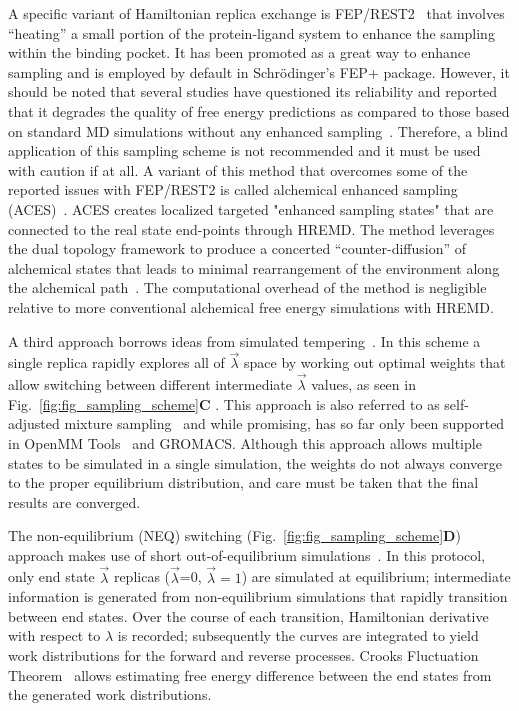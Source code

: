 \documentclass[9pt,bestpractices]{livecoms}
\begin{document}
A specific variant of Hamiltonian replica exchange is FEP/REST2~\cite{rest2, feprest} that involves ``heating'' a small portion of the protein-ligand system to enhance the sampling within the binding pocket. It has been promoted as a great way to enhance sampling and is employed by default in Schr\"{o}dinger's FEP+ package. However, it should be noted that several studies have questioned its reliability and reported that it degrades the quality of free energy predictions as compared to those based on standard MD simulations without any enhanced sampling~\cite{wan2020fep+, bhati2022}. Therefore, a blind application of this sampling scheme is not recommended and it must be used with caution if at all. A variant of this method that overcomes some of the reported issues with FEP/REST2 is called alchemical enhanced sampling (ACES)~\cite{lee2023aces}. ACES creates localized targeted "enhanced sampling states" that are connected to the real state end-points through HREMD.  The method leverages the dual topology framework to produce a concerted “counter-diffusion” of alchemical states that leads to minimal rearrangement of the environment along the alchemical path~\cite{York_ACSPhysChemAu_2023_v3_p478}. The computational overhead of the method is negligible relative to more conventional alchemical free energy simulations with HREMD.

A third approach borrows ideas from simulated tempering~\cite{marinari1992simulated}. In this scheme a single replica rapidly explores all of $\vec{\lambda}$ space by working out optimal weights that allow switching between different intermediate $\vec{\lambda}$ values, as seen in Fig.~\ref{fig:fig_sampling_scheme}\textbf{C} . This approach is also referred to as self-adjusted mixture sampling~\cite{lyubartsev1992new, li2007simulated, tan2017optimally} and while promising, has so far only been supported in OpenMM Tools~\cite{andrearizzi2019choderalab} and GROMACS.  Although this approach allows multiple states to be simulated in a single simulation, the weights do not always converge to the proper equilibrium distribution, and care must be taken that the final results are converged. 

The non-equilibrium (NEQ) switching (Fig.~\ref{fig:fig_sampling_scheme}\textbf{D}) approach makes use of short out-of-equilibrium simulations~\cite{aldeghi2018accurate}. In this protocol, only end state $\vec{\lambda}$ replicas ($\vec{\lambda}$=0, $\vec{\lambda}=1$) are simulated at equilibrium; intermediate information is generated from non-equilibrium simulations that rapidly transition between end states. 
Over the course of each transition, Hamiltonian derivative with respect to $\lambda$ is recorded; subsequently the curves are integrated to yield work distributions for the forward and reverse processes. Crooks Fluctuation Theorem~\cite{crooks1999entropy} allows estimating free energy difference between the end states from the generated work distributions.~\cite{shirts2003equilibrium}
\end{document}
